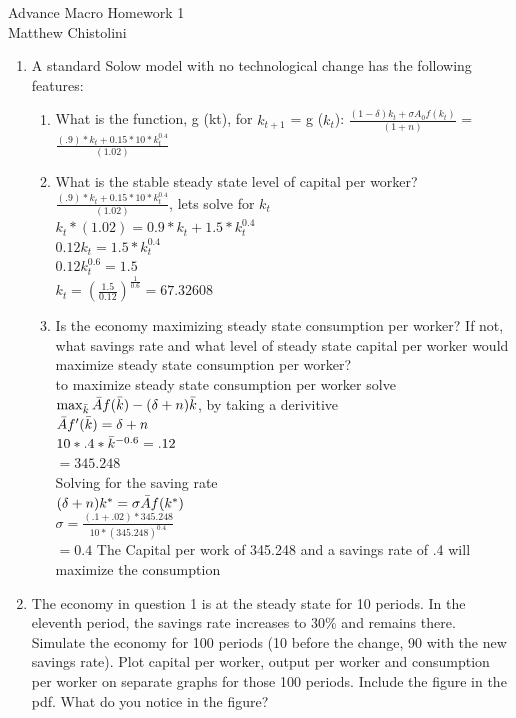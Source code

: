\documentclass[12pt,oneside,reqno]{amsart}
\begin{document}
\begin{center}
    \Huge{Advance Macro Homework 1}\\
    \large{Matthew Chistolini}
\end{center}
\vspace{-.3cm}
\begin{enumerate}
    \item A standard Solow model with no technological change has the following features:
    \begin{enumerate}
        \item What is the function, g (kt), for $k_{t+1}$ = g ($k_t$): $\frac{(1-\delta)k_t+\sigma A_0 f(k_t)}{(1+n)}$ = $\frac{(.9)*k_t+0.15*10 *k_t^{0.4}}{(1.02)}$
        \item What is the stable steady state level of capital per worker? \\
        $\frac{(.9)*k_t+0.15*10 *k_t^{0.4}}{(1.02)}$, lets solve for $k_t$ \\
        $k_t*(1.02) = 0.9*k_t+1.5*k_t^{0.4}$\\
        $0.12k_t=1.5*k_t^{0.4}$\\
        $0.12k_t^{0.6}=1.5$\\
        $k_t=(\frac{1.5}{0.12})^{\frac{1}{0.6}}=67.32608$
        
        \item Is the economy maximizing steady state consumption per worker? If not, what savings rate and what level of steady state capital per worker would maximize steady state consumption per worker?\\
        to maximize steady state consumption per worker solve\\ $\max_{\Bar{k}} \Bar{A}f(\Bar{k})-(\delta+n)\Bar{k}$, by taking a derivitive\\
        $\Bar{A}f'(\Bar{k})=\delta+n$\\
        $10*.4*\Bar{k}^{-0.6}=.12$\\
        $=345.248$\\
        Solving for the saving rate\\
        $(\delta+n)k^*=\sigma\Bar{A}f(k^*)$\\
        $\sigma = \frac{(.1+.02)*345.248}{10*(345.248)^{0.4}}$\\
        $=0.4$ 
        The Capital per work of 345.248 and a savings rate of .4 will maximize the consumption
    \end{enumerate}
    \item The economy in question 1 is at the steady state for 10 periods. In the eleventh period, the savings rate increases to 30\% and remains there. Simulate the economy for 100 periods (10 before the change, 90 with the new savings rate). Plot capital per worker, output per worker and consumption per worker on separate graphs for those 100 periods. Include the figure in the pdf. What do you notice in the figure?\\
    

\end{enumerate}
\end{document}
